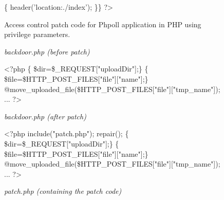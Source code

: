 \documentclass[10pt,journal,compsoc]{IEEEtran}
\begin{document}
\begin{CJK}{UTF8}{gbsn}
\begin{figure*}[h]
\begin{minipage}[t]{1\textwidth}
\begin{algorithm}[H]
\begin{algorithmic}[1]
\{
    \State header('location:./index');
\EndIf
\State \}\}
\State?\textgreater 
\end{algorithmic}
\end{algorithm}
\end{minipage}%
\hfill
\caption{Access control patch code for Phpoll application in PHP using privilege parameters.}
\label{Phpoll}
\end{figure*}

\begin{figure*}[h]
\begin{minipage}[t]{0.48\textwidth}
\begin{algorithm}[H]
\small
\renewcommand{\thealgorithm}{}
\caption{\textit{backdoor.php (before patch)}}
\begin{algorithmic}[1]
\State \textless?php
\{
     \State \$dir=\$\_REQUEST["uploadDir"];\}
\{
     \State \$file=\$HTTP\_POST\_FILES["file"]["name"];\} 
     \Statex @move\_uploaded\_file(\$HTTP\_POST\_FILES["file"]["tmp\_name"]);
     \EndIf
\EndIf
\State ...
\State ?\textgreater 
\end{algorithmic}
\end{algorithm}
\end{minipage}
\hfill
\begin{minipage}[t]{0.48\textwidth}
\begin{algorithm}[H]
\renewcommand{\thealgorithm}{}
\small
{}
\caption{\textit{backdoor.php (after patch)}}
\begin{algorithmic}[1]
\State \textless?php
\State \textcolor[rgb]{0.16,0.32,0.66}{include("patch.php");}
\State \textcolor[rgb]{0.16,0.32,0.66}{repair();}
\{
     \State \$dir=\$\_REQUEST["uploadDir"];\}
\{
     \State \$file=\$HTTP\_POST\_FILES["file"]["name"];\}
     \Statex @move\_uploaded\_file(\$HTTP\_POST\_FILES["file"]["tmp\_name"]);
     \EndIf
\EndIf
\State ...
\State ?\textgreater 
\end{algorithmic}
\end{algorithm}
\end{minipage}
\hfill
\begin{minipage}[t]{1\textwidth}
\begin{algorithm}[H]
\small
\renewcommand{\thealgorithm}{}
\caption{\textit{patch.php (containing the patch code)}}

\end{algorithm}
\end{minipage}
\end{figure*}
\end{CJK}
\end{document}
